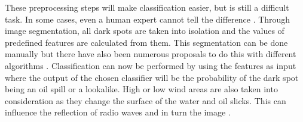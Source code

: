 These preprocessing steps will make classification easier, but is still a difficult task. In some cases, even a human expert cannot tell the difference \cite{Keramitsoglou2006640}. Through image segmentation, all dark spots are taken into isolation and the values of predefined features are calculated from them. This segmentation can be done manually but there have also been numerous proposals to do this with different algorithms \cite{ma2011sar,fjortoft1998optimal, ye2002wavelet}. Classification can now be performed by using the features as input where the output of the chosen classifier will be the probability of the dark spot being an oil spill or a lookalike. High or low wind areas are also taken into consideration as they change the surface of the water and oil slicks. This can influence the reflection of radio waves and in turn the image \cite{fingas2014review}.